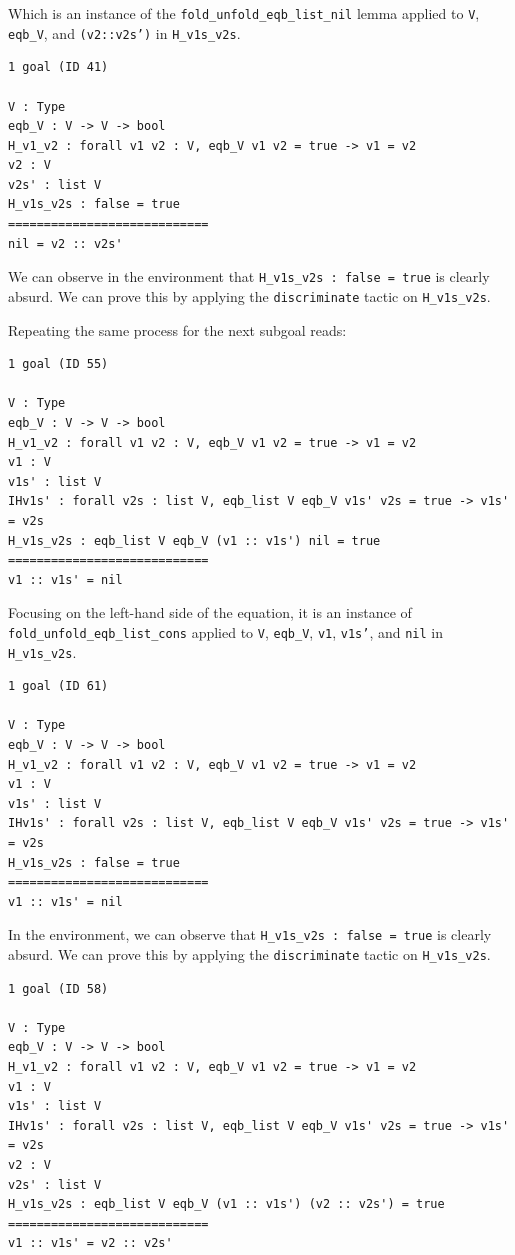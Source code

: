 \documentclass{article}
\begin{document}
Which is an instance of the \texttt{fold\_unfold\_eqb\_list\_nil} lemma applied to \texttt{V}, \texttt{eqb\_V}, and \texttt{(v2::v2s')} in \texttt{H\_v1s\_v2s}. 

\begin{lstlisting}
1 goal (ID 41)

V : Type
eqb_V : V -> V -> bool
H_v1_v2 : forall v1 v2 : V, eqb_V v1 v2 = true -> v1 = v2
v2 : V
v2s' : list V
H_v1s_v2s : false = true
============================
nil = v2 :: v2s'
\end{lstlisting}

We can observe in the environment that \texttt{H\_v1s\_v2s : false = true} is clearly absurd. We can prove this by applying the \texttt{discriminate} tactic on \texttt{H\_v1s\_v2s}.

Repeating the same process for the next subgoal reads:

\begin{lstlisting}
1 goal (ID 55)

V : Type
eqb_V : V -> V -> bool
H_v1_v2 : forall v1 v2 : V, eqb_V v1 v2 = true -> v1 = v2
v1 : V
v1s' : list V
IHv1s' : forall v2s : list V, eqb_list V eqb_V v1s' v2s = true -> v1s' = v2s
H_v1s_v2s : eqb_list V eqb_V (v1 :: v1s') nil = true
============================
v1 :: v1s' = nil
\end{lstlisting}

Focusing on the left-hand side of the equation, it is an instance of \texttt{fold\_unfold\_eqb\_list\_cons} applied to \texttt{V}, \texttt{eqb\_V}, \texttt{v1}, \texttt{v1s'}, and \texttt{nil} in \texttt{H\_v1s\_v2s}.

\begin{lstlisting}
1 goal (ID 61)

V : Type
eqb_V : V -> V -> bool
H_v1_v2 : forall v1 v2 : V, eqb_V v1 v2 = true -> v1 = v2
v1 : V
v1s' : list V
IHv1s' : forall v2s : list V, eqb_list V eqb_V v1s' v2s = true -> v1s' = v2s
H_v1s_v2s : false = true
============================
v1 :: v1s' = nil
\end{lstlisting}

In the environment, we can observe that \texttt{H\_v1s\_v2s : false = true} is clearly absurd. We can prove this by applying the \texttt{discriminate} tactic on \texttt{H\_v1s\_v2s}.

\begin{lstlisting}
1 goal (ID 58)

V : Type
eqb_V : V -> V -> bool
H_v1_v2 : forall v1 v2 : V, eqb_V v1 v2 = true -> v1 = v2
v1 : V
v1s' : list V
IHv1s' : forall v2s : list V, eqb_list V eqb_V v1s' v2s = true -> v1s' = v2s
v2 : V
v2s' : list V
H_v1s_v2s : eqb_list V eqb_V (v1 :: v1s') (v2 :: v2s') = true
============================
v1 :: v1s' = v2 :: v2s'
\end{lstlisting}
\end{document}
